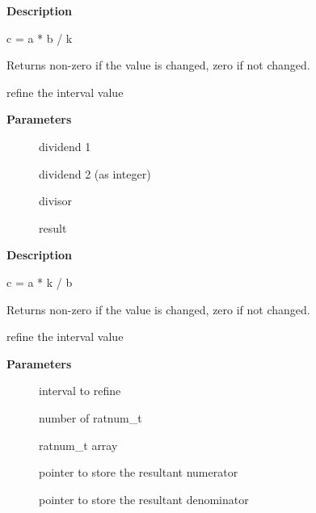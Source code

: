 \documentclass[a4paper,8pt,english]{sphinxmanual}
\begin{document}
\textbf{Description}

c = a * b / k

Returns non-zero if the value is changed, zero if not changed.

\begin{fulllineitems}
\label{sound/kernel-api/alsa-driver-api:c.snd_interval_mulkdiv}
refine the interval value

\end{fulllineitems}


\textbf{Parameters}
\begin{description}
\item[{}] \leavevmode
dividend 1

\item[{}] \leavevmode
dividend 2 (as integer)

\item[{}] \leavevmode
divisor

\item[{}] \leavevmode
result

\end{description}

\textbf{Description}

c = a * k / b

Returns non-zero if the value is changed, zero if not changed.

\begin{fulllineitems}
\label{sound/kernel-api/alsa-driver-api:c.snd_interval_ratnum}
refine the interval value

\end{fulllineitems}


\textbf{Parameters}
\begin{description}
\item[{}] \leavevmode
interval to refine

\item[{}] \leavevmode
number of ratnum\_t

\item[{}] \leavevmode
ratnum\_t array

\item[{}] \leavevmode
pointer to store the resultant numerator

\item[{}] \leavevmode
pointer to store the resultant denominator

\end{description}
\end{document}
